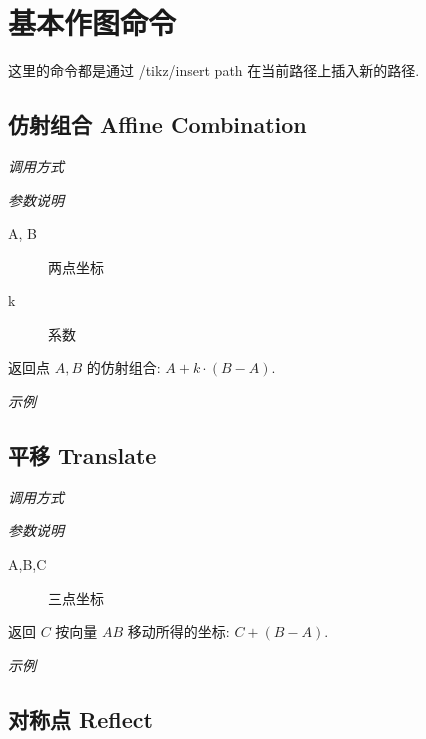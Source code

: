 \chapter{基本作图命令}

这里的命令都是通过 /tikz/insert path\cite{PATH} 在当前路径上插入新的路径.

\section{仿射组合 Affine Combination}

\emph{调用方式}

\begin{tcolorbox}{}
\end{tcolorbox}

\emph{参数说明}

\begin{description}
  \item[A, B] 两点坐标
  \item[k] 系数
\end{description}

返回点 $A, B$ 的仿射组合: $A + k \cdot (B-A)$.

\emph{示例}


\section{平移 Translate}

\emph{调用方式}

\begin{tcolorbox}{}
\end{tcolorbox}

\emph{参数说明}

\begin{description}
  \item[A,B,C] 三点坐标
\end{description}

返回 $C$ 按向量 $AB$ 移动所得的坐标: $C + (B-A)$.

\emph{示例}


\section{对称点 Reflect}

